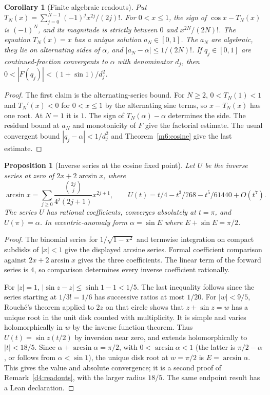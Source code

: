 \documentclass[11pt,reqno]{amsart}
\newtheorem{proposition}[theorem]{Proposition}
\newtheorem{corollary}[theorem]{Corollary}
\theoremstyle{definition}
\theoremstyle{remark}
\numberwithin{equation}{section}
\begin{document}
\begin{corollary}[Finite algebraic readouts]\label{m6:readouts}
Put \(T_N(x)=\sum_{j=0}^{N-1}(-1)^j x^{2j}/(2j)!\).
For \(0<x\le1\), the sign of \(\cos x-T_N(x)\) is \((-1)^N\),
and its magnitude is strictly between \(0\) and \(x^{2N}/(2N)!\).
The equation \(T_N(x)=x\) has a unique solution \(a_N\in[0,1]\).
The \(a_N\) are algebraic, they lie on alternating sides of
\(\alpha\), and \(|a_N-\alpha|\le 1/(2N)!\).
If \(q_j\in[0,1]\) are continued-fraction convergents to \(\alpha\)
with denominator \(d_j\), then
\(0<|F(q_j)|<(1+\sin1)/d_j^2\).
\end{corollary}
\begin{proof}
The first claim is the alternating-series bound. For \(N\ge2\),
\(0<T_N(1)<1\) and \(T_N'(x)<0\) for \(0<x\le1\) by the
alternating sine terms, so \(x-T_N(x)\) has one root.
At \(N=1\) it is \(1\). The sign of \(T_N(\alpha)-\alpha\)
determines the side. The residual bound at \(a_N\) and monotonicity
of \(F\) give the factorial estimate. The usual convergent bound
\(|q_j-\alpha|<1/d_j^2\) \cite[Ch.~X]{d4-hw} and
Theorem~\ref{m6:cosine} give the last estimate.
\end{proof}

\begin{proposition}[Inverse series at the cosine fixed point]\label{m6:inverse}
Let \(U\) be the inverse series at zero of \(2x+2\arcsin x\),
where
\[
 \arcsin x=\sum_{j\ge0}\frac{\binom{2j}{j}}{4^j(2j+1)}x^{2j+1},
 \qquad
 U(t)=t/4-t^3/768-t^5/61440+O(t^7).
\]
The series \(U\) has rational coefficients, converges absolutely
at \(t=\pi\), and \(U(\pi)=\alpha\). In eccentric-anomaly form
\(\alpha=\sin E\) where \(E+\sin E=\pi/2\).
\end{proposition}
\begin{proof}
The binomial series for \(1/\sqrt{1-x^2}\) and termwise integration
on compact subdisks of \(|x|<1\) give the displayed arcsine series.
Formal coefficient comparison against \(2x+2\arcsin x\) gives
the three coefficients. The linear term of the forward series
is \(4\), so comparison determines every inverse coefficient
rationally.

For \(|z|=1\), \(|\sin z-z|\le\sinh1-1<1/5\). The last
inequality follows since the series starting at \(1/3!=1/6\)
has successive ratios at most \(1/20\).
For \(|w|<9/5\), Rouch\'e's theorem applied to \(2z\) on
that circle shows that \(z+\sin z=w\) has a unique root in the
unit disk counted with multiplicity. It is simple and varies
holomorphically in \(w\) by the inverse function theorem.
Thus \(U(t)=\sin z(t/2)\) by inversion near zero, and extends
holomorphically to \(|t|<18/5\). Since
\(\alpha+\arcsin\alpha=\pi/2\), with \(0<\arcsin\alpha<1\)
(the latter is \(\pi/2-\alpha\), or follows from
\(\alpha<\sin1\)), the unique disk root at \(w=\pi/2\)
is \(E=\arcsin\alpha\). This gives the value and absolute
convergence; it is a second proof of Remark~\ref{d4:readouts}, with the larger radius \(18/5\). The same endpoint result has a Lean
declaration.
\end{proof}
\end{document}
